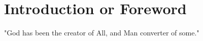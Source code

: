 \section*{Introduction or Foreword}
\label{sec:introduction}


"God has been the creator of All,
and Man converter of some." \cite{Keshe1}
